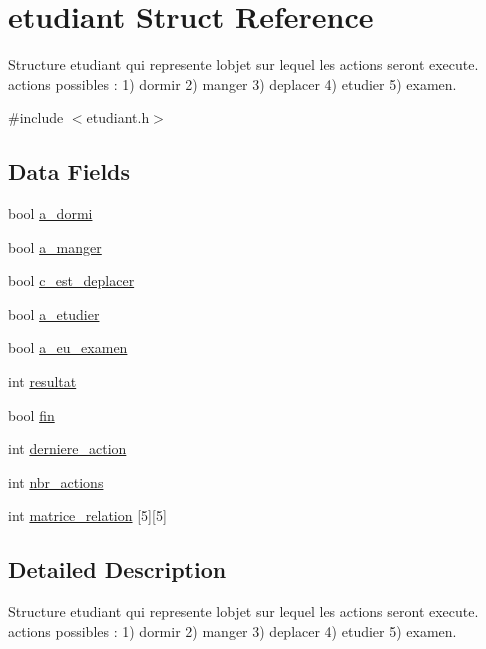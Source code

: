 \hypertarget{structetudiant}{}\section{etudiant Struct Reference}
\label{structetudiant}


Structure etudiant qui represente l\textquotesingle{}objet sur lequel les actions seront execute.~\newline
 actions possibles \+: 1) dormir 2) manger 3) deplacer 4) etudier 5) examen.  




{\ttfamily \#include $<$etudiant.\+h$>$}

\subsection*{Data Fields}
\begin{DoxyCompactItemize}
\item 
bool \mbox{\hyperlink{structetudiant_ab575e5ab79716a46f71bbb3d3095a130}{a\+\_\+dormi}}
\item 
bool \mbox{\hyperlink{structetudiant_a7638614d16ba435a0690f2fa28c1be1c}{a\+\_\+manger}}
\item 
bool \mbox{\hyperlink{structetudiant_a44f542d299bc0261dbcf9c1ddf147bd0}{c\+\_\+est\+\_\+deplacer}}
\item 
bool \mbox{\hyperlink{structetudiant_a9022dc1243cf6d45d28c0fd346653467}{a\+\_\+etudier}}
\item 
bool \mbox{\hyperlink{structetudiant_a56462b6893e12ab24e3eb8b836090bcd}{a\+\_\+eu\+\_\+examen}}
\item 
int \mbox{\hyperlink{structetudiant_a8afc85cb27005e2bd7dfc73222b85a46}{resultat}}
\item 
bool \mbox{\hyperlink{structetudiant_a0b113aac112ac144399879c086aac230}{fin}}
\item 
int \mbox{\hyperlink{structetudiant_aed4f7574081acaa56f53d62c3f102c18}{derniere\+\_\+action}}
\item 
int \mbox{\hyperlink{structetudiant_ad778ea2854803a23bf94e8370999e5ed}{nbr\+\_\+actions}}
\item 
int \mbox{\hyperlink{structetudiant_acdc27985d3240acfcd769d2c2ae3a0bb}{matrice\+\_\+relation}} \mbox{[}5\mbox{]}\mbox{[}5\mbox{]}
\end{DoxyCompactItemize}


\subsection{Detailed Description}
Structure etudiant qui represente l\textquotesingle{}objet sur lequel les actions seront execute.~\newline
 actions possibles \+: 1) dormir 2) manger 3) deplacer 4) etudier 5) examen. 

